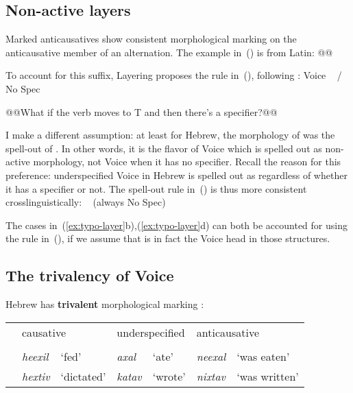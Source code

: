 	\subsection{Non-active layers}
Marked anticausatives show consistent morphological marking on the anticausative member of an alternation. The example in~(\nextx) is from Latin:
\ex @@
\xe

To account for this suffix, Layering proposes the rule in~(\nextx), following \cite{embick04}:
\ex Voice \lra~ / \trace No Spec
\xe

@@What if the verb moves to T and then there's a specifier?@@

I make a different assumption: at least for Hebrew, the morphology of {\tnif} was the spell-out of {\vz}. In other words, it is the flavor of Voice which is spelled out as non-active morphology, not Voice when it has no specifier. Recall the reason for this preference: underspecified Voice in Hebrew is spelled out as {\tkal} regardless of whether it has a specifier or not. The spell-out rule in~(\nextx) is thus more consistent crosslinguistically:
\ex {\vz} \lra~ \hfill (always No Spec)
\xe

The cases in~(\ref{ex:typo-layer}b),(\ref{ex:typo-layer}d) can both be accounted for using the rule in~(\lastx), if we assume that {\vz} is in fact the Voice head in those structures.
	
	\subsection{The trivalency of Voice}


\ex\label{ex:alternations-heb}Hebrew has \textbf{trivalent} morphological marking \citep{kastner18nllt}:\\
	\begin{tabular}{cll|ll|ll}
	& \multicolumn{2}{P{4.2cm}|}{causative} &	\multicolumn{2}{P{4cm}|}{underspecified}	& \multicolumn{2}{P{4.2cm}}{anticausative}\\\cline{2-7}
	\phantom{Semantics} & \multicolumn{2}{c|}{\thif}	&	\multicolumn{2}{c|}{\tkal}	& \multicolumn{2}{c}{\tnif}\\
	& \emph{heexil}	& `fed' &	\emph{axal}	& `ate'	&	\emph{neexal}	& `was eaten' \\
	& \emph{hextiv}	& `dictated' &	\emph{katav}	& `wrote'	&	\emph{nixtav}	& `was written' \\
	\end{tabular}
\xe

